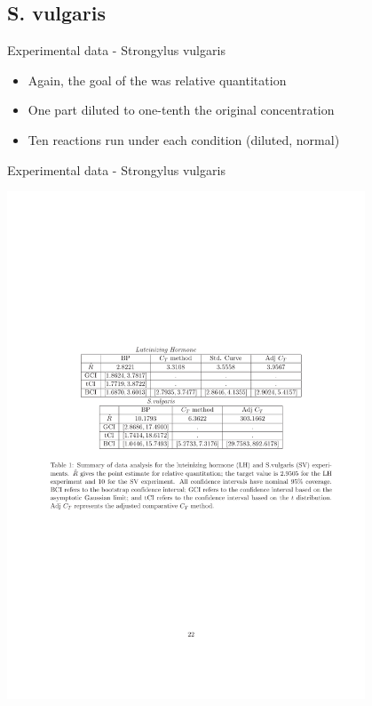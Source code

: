 \documentclass{beamer}
\begin{document}
\subsection{S. vulgaris}


\begin{frame}{Experimental data - Strongylus vulgaris} 
\begin{itemize}
  \item Again, the goal of the was relative quantitation
  \item One part diluted to one-tenth the original concentration
  \item Ten reactions run under each condition (diluted, normal)
\end{itemize}
\end{frame} 


\begin{frame}{Experimental data - Strongylus vulgaris} 
\begin{center}
  \includegraphics[width=0.8\textwidth]{figures/sv-results}
\end{center}
\end{frame} 
\end{document}
